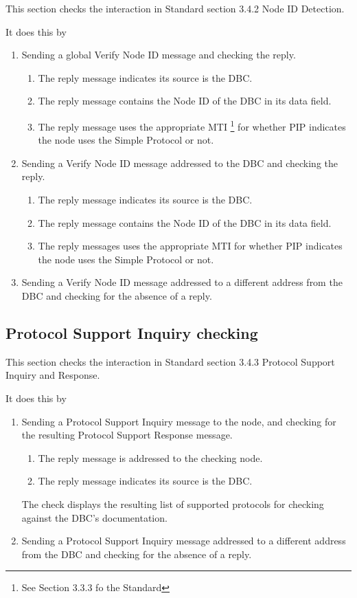\documentclass[11pt]{article}
\begin{document}
This section checks the interaction in Standard section 3.4.2 Node ID Detection.

It does this by

\begin{enumerate}
\item Sending a global Verify Node ID message and checking the reply.
    \begin{enumerate}
    \item The reply message indicates its source is the DBC.
    \item The reply message contains the Node ID of the DBC in its data field.
    \item The reply message uses the appropriate MTI
            \footnote{See Section 3.3.3 fo the Standard}
            for whether PIP indicates the node 
            uses the Simple Protocol or not.
    \end{enumerate}

\item Sending a Verify Node ID message addressed to the DBC and checking the reply.
    \begin{enumerate}
    \item The reply message indicates its source is the DBC.
    \item The reply message contains the Node ID of the DBC in its data field.
    \item The reply messages uses the appropriate MTI for whether PIP indicates the node 
            uses the Simple Protocol or not.
    \end{enumerate}

\item Sending a Verify Node ID message addressed to a different address from the DBC
        and checking for the absence of a reply.
\end{enumerate}

\subsection{Protocol Support Inquiry checking}

This section checks the interaction in Standard section 3.4.3 Protocol Support Inquiry and Response.

It does this by 
\begin{enumerate}
\item Sending a Protocol Support Inquiry message to the node, 
and checking for the resulting Protocol Support Response message.  
    \begin{enumerate}
    \item The reply message is addressed to the checking node.
    \item The reply message indicates its source is the DBC.
    \end{enumerate}
The check displays the resulting list of supported protocols for checking against the 
DBC's documentation.

\item Sending a Protocol Support Inquiry message addressed to a different address from the DBC
        and checking for the absence of a reply.
\end{enumerate}
\end{document}

